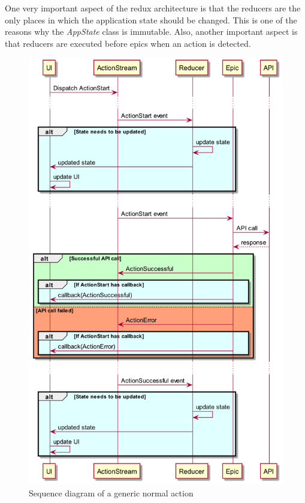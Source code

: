 \documentclass[a4paper,12pt]{report}
\begin{document}
One very important aspect of the redux architecture is that the reducers are
the only places in which the application state should be changed. This is one
of the reasons why the \textit{AppState} class is immutable. Also, another
important aspect is that reducers are executed before epics when an action is
detected.

\begin{figure}[H]
    \centering
    \includegraphics[scale=0.3]{diagrams/sequence/action.png}
    \caption{Sequence diagram of a generic normal action}\label{fig:action_sequence}
\end{figure}
\end{document}
